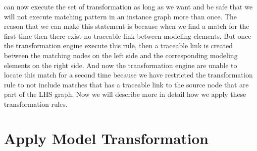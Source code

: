 can now execute the set of transformation as long as we want and be safe that we
will not execute matching pattern in an instance graph more than once. The
reason that we can make this statement is because when we find a match for the
first time then there exist no traceable link between modeling elements. But
once the transformation engine execute this rule, then a traceable link is
created between the matching nodes on the left side and the corresponding
modeling elements on the right side. And now the transformation engine are
unable to locate this match for a second time because we have restricted the
transformation rule to not include matches that has a traceable link to the
source node that are part of the LHS graph. Now we will describe more in detail
how we apply these transformation rules. 

\section{Apply Model Transformation}

